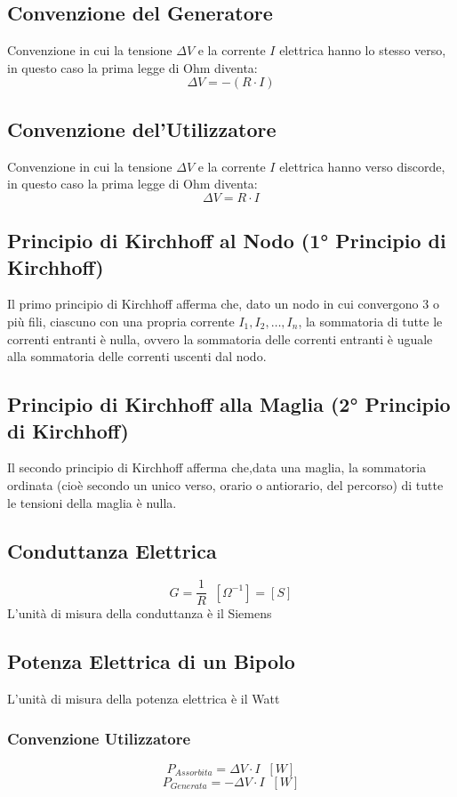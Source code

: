 \documentclass[../main.tex]{subfiles}
\begin{document}
	\subsection{Convenzione del Generatore}
	Convenzione in cui la tensione $\Delta V$ e la corrente $I$ elettrica hanno lo stesso verso, in questo caso la prima legge di Ohm diventa:
	\begin{equation}
		\Delta V = - (R \cdot I)
	\end{equation}
	\subsection{Convenzione del'Utilizzatore}
	Convenzione in cui la tensione $\Delta V$ e la corrente $I$ elettrica hanno verso discorde, in questo caso la prima legge di Ohm diventa:
	\begin{equation}
		\Delta V = R \cdot I
	\end{equation}
	\subsection{Principio di Kirchhoff al Nodo (1° Principio di Kirchhoff)}
	Il primo principio di Kirchhoff afferma che, dato un nodo in cui convergono 3 o più fili, ciascuno con una propria corrente $I_1,I_2, \dots,I_n$, la sommatoria di tutte le correnti entranti è nulla, ovvero la sommatoria delle correnti entranti è uguale alla sommatoria delle correnti uscenti dal nodo.
	\subsection{Principio di Kirchhoff alla Maglia (2° Principio di Kirchhoff)}
	Il secondo principio di Kirchhoff afferma che,data una maglia, la sommatoria ordinata (cioè secondo un unico verso, orario o antiorario, del percorso) di tutte le tensioni della maglia è nulla.
	\subsection{Conduttanza Elettrica}
	\[G = \frac{1}{R} \;\; [\Omega ^{-1}] = [S]\]
	L'unità di misura della conduttanza è il Siemens
	\subsection{Potenza Elettrica di un Bipolo}
	L'unità di misura della potenza elettrica è il Watt
	\subsubsection{Convenzione Utilizzatore}
	\[P_{Assorbita} = \Delta V \cdot I \;\; [W]\]
	\[P_{Generata} = -\Delta V \cdot I \;\; [W]\]
\end{document}

